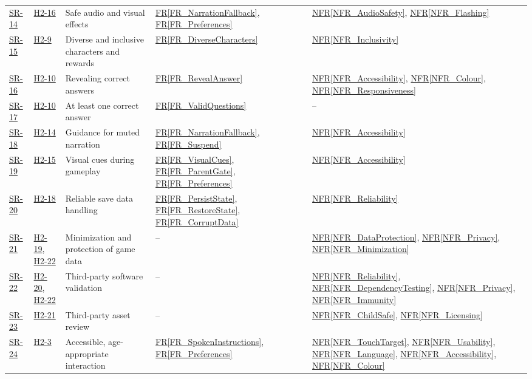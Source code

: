 \documentclass[10pt]{article}
\newcommand{\rref}[1]{\hyperref[#1]{FR\ref*{#1}}}
\newcommand{\nfrref}[1]{\hyperref[#1]{NFR\ref*{#1}}}
\newcommand{\haurl}{https://team-hindsight.github.io/ophthamology-game/HazardAnalysis/HazardAnalysis.pdf}
\newcommand{\hasrref}[2]{\href{\haurl\#nameddest=sr:#1}{SR-#2}}
\newcommand{\hahazref}[2]{\href{\haurl\#nameddest=haz:#1}{H#2}}
\begin{document}
\begin{longtable}{p{} p{} >{\raggedright\arraybackslash}p{} >{\raggedright\arraybackslash}p{} >{\raggedright\arraybackslash}p{}}
\hasrref{SafeAudioVisuals}{14} & \hahazref{UnsafeAudioVisuals}{2-16} & Safe audio and visual effects & \rref{FR_NarrationFallback}, \rref{FR_Preferences} & \nfrref{NFR_AudioSafety}, \nfrref{NFR_Flashing} \\
\hasrref{CharacterDiversityInclusivity}{15} & \hahazref{DiverseCharacterCatalogue}{2-9} & Diverse and inclusive characters and rewards & \rref{FR_DiverseCharacters} & \nfrref{NFR_Inclusivity} \\
\hasrref{CorrectAnswerReveal}{16} & \hahazref{CorrectAnswerReveal}{2-10} & Revealing correct answers & \rref{FR_RevealAnswer} & \nfrref{NFR_Accessibility}, \nfrref{NFR_Colour}, \nfrref{NFR_Responsiveness} \\
\hasrref{AtLeastOneCorrectAnswer}{17} & \hahazref{CorrectAnswerReveal}{2-10} & At least one correct answer & \rref{FR_ValidQuestions} & -- \\
\hasrref{NarrationMuted}{18} & \hahazref{NarrationDisabledSetting}{2-14} & Guidance for muted narration & \rref{FR_NarrationFallback}, \rref{FR_Suspend} & \nfrref{NFR_Accessibility} \\
\hasrref{VisualCuesSetting}{19} & \hahazref{VisualCuesDisabledSetting}{2-15} & Visual cues during gameplay & \rref{FR_VisualCues}, \rref{FR_ParentGate}, \rref{FR_Preferences} & \nfrref{NFR_Accessibility} \\
\hasrref{ReliableSaveData}{20} & \hahazref{SaveDataCorruption}{2-18} & Reliable save data handling & \rref{FR_PersistState}, \rref{FR_RestoreState}, \rref{FR_CorruptData} & \nfrref{NFR_Reliability} \\
\hasrref{MinimalSaveData}{21} & \hahazref{SaveDataPrivacy}{2-19}, \hahazref{UnexpectedDataTransmission}{2-22} & Minimization and protection of game data & -- & \nfrref{NFR_DataProtection}, \nfrref{NFR_Privacy}, \nfrref{NFR_Minimization} \\
\hasrref{ThirdPartyValidation}{22} & \hahazref{ThirdPartyFailure}{2-20}, \hahazref{UnexpectedDataTransmission}{2-22} & Third-party software validation & -- & \nfrref{NFR_Reliability}, \nfrref{NFR_DependencyTesting}, \nfrref{NFR_Privacy}, \nfrref{NFR_Immunity} \\
\hasrref{ThirdPartyAssetReview}{23} & \hahazref{ThirdPartyAssetContent}{2-21} & Third-party asset review & -- & \nfrref{NFR_ChildSafe}, \nfrref{NFR_Licensing} \\
\hasrref{AccessibleInteraction}{24} & \hahazref{InaccessibleInteraction}{2-3} & Accessible, age-appropriate interaction & \rref{FR_SpokenInstructions}, \rref{FR_Preferences} & \nfrref{NFR_TouchTarget}, \nfrref{NFR_Usability}, \nfrref{NFR_Language}, \nfrref{NFR_Accessibility}, \nfrref{NFR_Colour} \\

\end{longtable}
\end{document}
